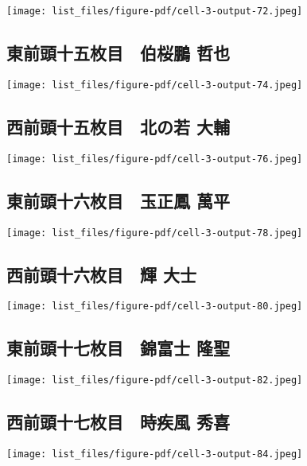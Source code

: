 \documentclass[
]{bxjsarticle}
\begin{document}
\texttt{[image: list\_files/figure-pdf/cell-3-output-72.jpeg]}

\subsection{東前頭十五枚目　伯桜鵬
哲也}\label{ux6771ux524dux982dux5341ux4e94ux679aux76ee-ux4f2fux685cux9d6c-ux54f2ux4e5f}

\texttt{[image: list\_files/figure-pdf/cell-3-output-74.jpeg]}

\subsection{西前頭十五枚目　北の若
大輔}\label{ux897fux524dux982dux5341ux4e94ux679aux76ee-ux5317ux306eux82e5-ux5927ux8f14}

\texttt{[image: list\_files/figure-pdf/cell-3-output-76.jpeg]}

\subsection{東前頭十六枚目　玉正鳳
萬平}\label{ux6771ux524dux982dux5341ux516dux679aux76ee-ux7389ux6b63ux9cf3-ux842cux5e73}

\texttt{[image: list\_files/figure-pdf/cell-3-output-78.jpeg]}

\subsection{西前頭十六枚目　輝
大士}\label{ux897fux524dux982dux5341ux516dux679aux76ee-ux8f1d-ux5927ux58eb}

\texttt{[image: list\_files/figure-pdf/cell-3-output-80.jpeg]}

\subsection{東前頭十七枚目　錦富士
隆聖}\label{ux6771ux524dux982dux5341ux4e03ux679aux76ee-ux9326ux5bccux58eb-ux9686ux8056}

\texttt{[image: list\_files/figure-pdf/cell-3-output-82.jpeg]}

\subsection{西前頭十七枚目　時疾風
秀喜}\label{ux897fux524dux982dux5341ux4e03ux679aux76ee-ux6642ux75beux98a8-ux79c0ux559c}

\texttt{[image: list\_files/figure-pdf/cell-3-output-84.jpeg]}
\end{document}
